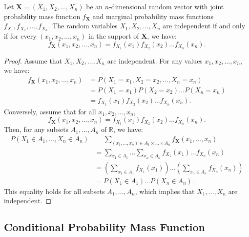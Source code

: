 \begin{proposition}
Let $\mathbf{X} = (X_{1}, X_{2}, \ldots, X_{n})$ be an $n$-dimensional random vector with joint probability mass function $f_{\mathbf{X}}$ and marginal probability mass functions $f_{X_{1}}, f_{X_{2}}, \ldots, f_{X_{n}}$. The random variables $X_{1}, X_{2}, \ldots, X_{n}$ are independent if and only if for every $(x_{1}, x_{2}, \ldots, x_{n})$ in the support of $\mathbf{X}$, we have:
\[
f_{\mathbf{X}}(x_{1}, x_{2}, \ldots, x_{n}) = f_{X_{1}}(x_{1}) f_{X_{2}}(x_{2}) \ldots f_{X_{n}}(x_{n}).
\]
\end{proposition}
\begin{proof}
Assume that $X_{1}, X_{2}, \ldots, X_{n}$ are independent. For any values $x_{1}, x_{2}, \ldots, x_{n}$, we have:
\[
\begin{aligned}
f_{\mathbf{X}}(x_{1}, x_{2}, \ldots, x_{n}) &= P(X_{1} = x_{1}, X_{2} = x_{2}, \ldots, X_{n} = x_{n}) \\
&= P(X_{1} = x_{1}) P(X_{2} = x_{2}) \ldots P(X_{n} = x_{n}) \\
&= f_{X_{1}}(x_{1}) f_{X_{2}}(x_{2}) \ldots f_{X_{n}}(x_{n}).
\end{aligned}
\]
Conversely, assume that for all $x_{1}, x_{2}, \ldots, x_{n}$,
\[
f_{\mathbf{X}}(x_{1}, x_{2}, \ldots, x_{n}) = f_{X_{1}}(x_{1}) f_{X_{2}}(x_{2}) \ldots f_{X_{n}}(x_{n}).
\]
Then, for any subsets $A_{1}, \ldots, A_{n}$ of $\mathbb{R}$, we have:
\[
\begin{aligned}
P\left( X_{1} \in A_{1}, \ldots, X_{n} \in A_{n} \right) &= \sum_{(x_{1}, \ldots, x_{n}) \in A_{1} \times \ldots \times A_{n}} f_{\mathbf{X}}(x_{1}, \ldots, x_{n}) \\
&= \sum_{x_{1} \in A_{1}} \ldots \sum_{x_{n} \in A_{n}} f_{X_{1}}(x_{1}) \ldots f_{X_{n}}(x_{n}) \\
&= \left( \sum_{x_{1} \in A_{1}} f_{X_{1}}(x_{1}) \right) \ldots \left( \sum_{x_{n} \in A_{n}} f_{X_{n}}(x_{n}) \right) \\
&= P(X_{1} \in A_{1}) \ldots P(X_{n} \in A_{n}).
\end{aligned}
\]
This equality holds for all subsets $A_{1}, \ldots, A_{n}$, which implies that $X_{1}, \ldots, X_{n}$ are independent.
\end{proof}


\subsection{Conditional Probability Mass Function}

